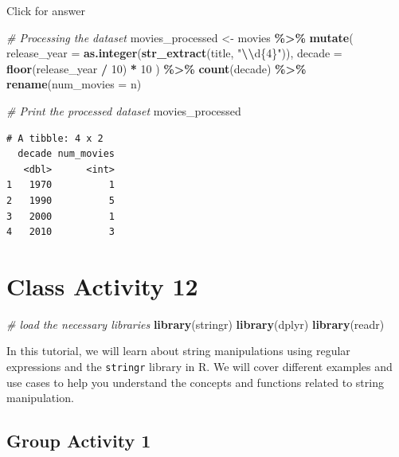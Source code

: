 \documentclass[
]{book}
\newenvironment{Shaded}{\begin{snugshade}}{\end{snugshade}}
\newcommand{\AttributeTok}[1]{\textcolor[rgb]{0.13,0.29,0.53}{#1}}
\newcommand{\CommentTok}[1]{\textcolor[rgb]{0.56,0.35,0.01}{\textit{#1}}}
\newcommand{\DecValTok}[1]{\textcolor[rgb]{0.00,0.00,0.81}{#1}}
\newcommand{\FunctionTok}[1]{\textcolor[rgb]{0.13,0.29,0.53}{\textbf{#1}}}
\newcommand{\NormalTok}[1]{#1}
\newcommand{\OtherTok}[1]{\textcolor[rgb]{0.56,0.35,0.01}{#1}}
\newcommand{\SpecialCharTok}[1]{\textcolor[rgb]{0.81,0.36,0.00}{\textbf{#1}}}
\newcommand{\StringTok}[1]{\textcolor[rgb]{0.31,0.60,0.02}{#1}}
\begin{document}
Click for answer

\begin{Shaded}
\begin{Highlighting}[]
\CommentTok{\# Processing the dataset}
\NormalTok{movies\_processed }\OtherTok{\textless{}{-}}\NormalTok{ movies }\SpecialCharTok{\%\textgreater{}\%}
  \FunctionTok{mutate}\NormalTok{(}
    \AttributeTok{release\_year =} \FunctionTok{as.integer}\NormalTok{(}\FunctionTok{str\_extract}\NormalTok{(title, }\StringTok{"}\SpecialCharTok{\textbackslash{}\textbackslash{}}\StringTok{d\{4\}"}\NormalTok{)),}
    \AttributeTok{decade =} \FunctionTok{floor}\NormalTok{(release\_year }\SpecialCharTok{/} \DecValTok{10}\NormalTok{) }\SpecialCharTok{*} \DecValTok{10}
\NormalTok{  ) }\SpecialCharTok{\%\textgreater{}\%}
  \FunctionTok{count}\NormalTok{(decade) }\SpecialCharTok{\%\textgreater{}\%}
  \FunctionTok{rename}\NormalTok{(}\AttributeTok{num\_movies =}\NormalTok{ n)}

\CommentTok{\# Print the processed dataset}
\NormalTok{movies\_processed}
\end{Highlighting}
\end{Shaded}

\begin{verbatim}
# A tibble: 4 x 2
  decade num_movies
   <dbl>      <int>
1   1970          1
2   1990          5
3   2000          1
4   2010          3
\end{verbatim}

\hypertarget{class-activity-12}{%
\chapter{Class Activity 12}\label{class-activity-12}}

\begin{Shaded}
\begin{Highlighting}[]
\CommentTok{\# load the necessary libraries}
\FunctionTok{library}\NormalTok{(stringr)}
\FunctionTok{library}\NormalTok{(dplyr)}
\FunctionTok{library}\NormalTok{(readr)}
\end{Highlighting}
\end{Shaded}

In this tutorial, we will learn about string manipulations using regular expressions and the \texttt{stringr} library in R. We will cover different examples and use cases to help you understand the concepts and functions related to string manipulation.

\hypertarget{group-activity-1}{%
\section{Group Activity 1}\label{group-activity-1}}
\end{document}
